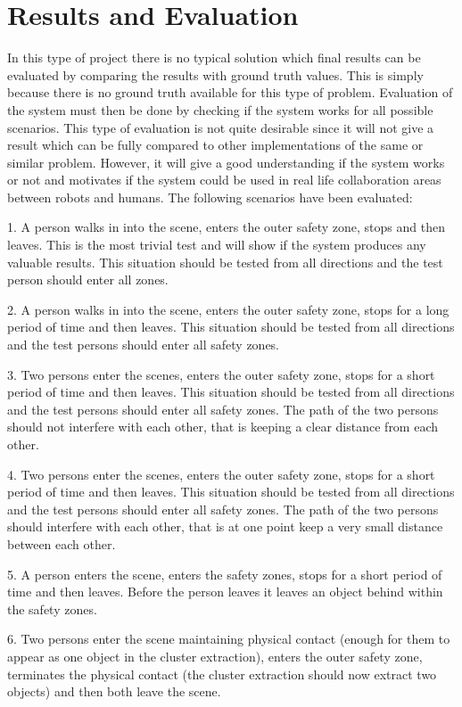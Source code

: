\section{Results and Evaluation}
In this type of project there is no typical solution which final results can be evaluated by comparing the results with ground truth values. This is simply because there is no ground truth available for this type of problem. Evaluation of the system must then be done by checking if the system works for all possible scenarios. This type of evaluation is not quite desirable since it will not give a result which can be fully compared to other implementations of the same or similar problem. However, it will give a good understanding if the system works or not and motivates if the system could be used in real life collaboration areas between robots and humans. The following scenarios have been evaluated:

1. A person walks in into the scene, enters the outer safety zone, stops and then leaves. This is the most trivial test and will show if the system produces any valuable results. This situation should be tested from all directions and the test person should enter all zones. 

2.  A person walks in into the scene, enters the outer safety zone, stops for a long period of time and then leaves. This situation should be tested from all directions and the test persons should enter all safety zones.

3. Two persons enter the scenes, enters the outer safety zone, stops for a short period of time and then leaves. This situation should be tested from all directions and the test persons should enter all safety zones. The path of the two persons should not interfere with each other, that is keeping a clear distance from each other. 

4. Two persons enter the scenes, enters the outer safety zone, stops for a short period of time and then leaves. This situation should be tested from all directions and the test persons should enter all safety zones. The path of the two persons should interfere with each other, that is at one point keep a very small distance between each other. 

5. A person enters the scene, enters the safety zones, stops for a short period of time and then leaves. Before the person leaves it leaves an object behind within the safety zones. 

6. Two persons enter the scene maintaining physical contact (enough for them to appear as one object in the cluster extraction), enters the outer safety zone, terminates the physical contact (the cluster extraction should now extract two objects) and then both leave the scene.

